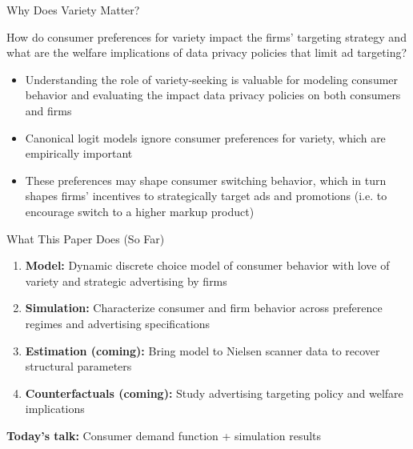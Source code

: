 \documentclass[aspectratio=169,professionalfonts]{beamer}
\newcommand{\hl}[1]{\textbf{\textcolor{UGARed}{#1}}}
\begin{document}
\begin{frame}{Why Does Variety Matter?}
  \begin{tcolorbox}[colback=red!5!white, colframe=UGARed, title=\textbf{Research Question}]
    How do consumer preferences for variety impact the firms' targeting strategy and what are the welfare implications of data privacy policies that limit ad targeting?
  \end{tcolorbox}
  \begin{itemize}
    \item Understanding the role of variety-seeking is valuable for modeling consumer behavior and evaluating the impact data privacy policies on both consumers and firms 
    \item Canonical logit models ignore consumer preferences for variety, which are
          empirically important 
    \item These preferences may shape consumer switching behavior, which in turn
          shapes firms' incentives to strategically target ads and promotions (i.e. to encourage switch to a higher markup product)
  \end{itemize}
\end{frame}

\begin{frame}{What This Paper Does (So Far)}
  \begin{enumerate}
    \item \hl{Model:} Dynamic discrete choice model of consumer behavior with love of variety and strategic advertising by firms
    \vspace{4pt}
    \item \hl{Simulation:} Characterize consumer and firm behavior
          across preference regimes and advertising
          specifications
    \vspace{4pt}
    \item \hl{Estimation (coming):} Bring model to Nielsen scanner data
          to recover structural parameters
    \vspace{4pt}
    \item \hl{Counterfactuals (coming):} Study advertising targeting policy and
          welfare implications
  \end{enumerate}
  \vspace{6pt}
  \textbf{Today's talk:} Consumer demand function + simulation results
\end{frame}
\end{document}
